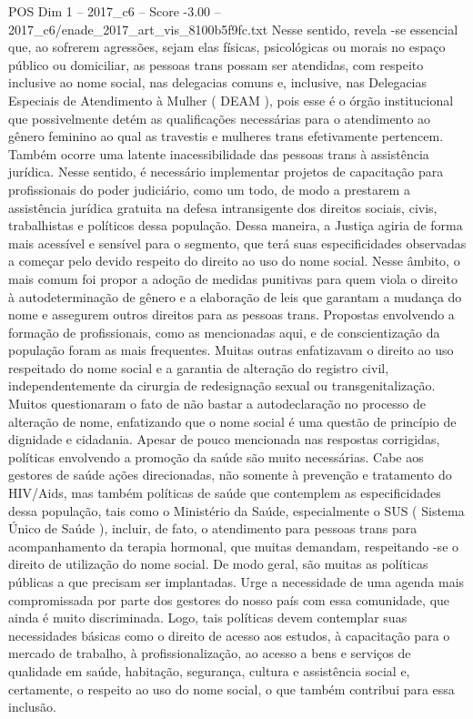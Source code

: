 \begin{textsample}{POS Dim 1 – 2017\_c6 – Score -3.00 – 2017\_c6/enade\_2017\_art\_vis\_8100b5f9fc.txt}
Nesse sentido, revela -se essencial que, ao sofrerem agressões, sejam elas físicas, psicológicas ou morais no espaço público ou domiciliar, as pessoas trans possam ser atendidas, com respeito inclusive ao nome social, nas delegacias comuns e, inclusive, nas Delegacias Especiais de Atendimento à Mulher ( DEAM ), pois esse é o órgão institucional que possivelmente detém as qualificações necessárias para o atendimento ao gênero feminino ao qual as travestis e mulheres trans efetivamente pertencem.
Também ocorre uma latente inacessibilidade das pessoas trans à assistência jurídica.
Nesse sentido, é necessário implementar projetos de capacitação para profissionais do poder judiciário, como um todo, de modo a prestarem a assistência jurídica gratuita na defesa intransigente dos direitos sociais, civis, trabalhistas e políticos dessa população.
Dessa maneira, a Justiça agiria de forma mais acessível e sensível para o segmento, que terá suas especificidades observadas a começar pelo devido respeito do direito ao uso do nome social.
Nesse âmbito, o mais comum foi propor a adoção de medidas punitivas para quem viola o direito à autodeterminação de gênero e a elaboração de leis que garantam a mudança do nome e assegurem outros direitos para as pessoas trans.
Propostas envolvendo a formação de profissionais, como as mencionadas aqui, e de conscientização da população foram as mais frequentes.
Muitas outras enfatizavam o direito ao uso respeitado do nome social e a garantia de alteração do registro civil, independentemente da cirurgia de redesignação sexual ou transgenitalização.
Muitos questionaram o fato de não bastar a autodeclaração no processo de alteração de nome, enfatizando que o nome social é uma questão de princípio de dignidade e cidadania.
Apesar de pouco mencionada nas respostas corrigidas, políticas envolvendo a promoção da saúde são muito necessárias.
Cabe aos gestores de saúde ações direcionadas, não somente à prevenção e tratamento do HIV/Aids, mas também políticas de saúde que contemplem as especificidades dessa população, tais como o Ministério da Saúde, especialmente o SUS ( Sistema Único de Saúde ), incluir, de fato, o atendimento para pessoas trans para acompanhamento da terapia hormonal, que muitas demandam, respeitando -se o direito de utilização do nome social.
De modo geral, são muitas as políticas públicas a que precisam ser implantadas.
Urge a necessidade de uma agenda mais compromissada por parte dos gestores do nosso país com essa comunidade, que ainda é muito discriminada.
Logo, tais políticas devem contemplar suas necessidades básicas como o direito de acesso aos estudos, à capacitação para o mercado de trabalho, à profissionalização, ao acesso a bens e serviços de qualidade em saúde, habitação, segurança, cultura e assistência social e, certamente, o respeito ao uso do nome social, o que também contribui para essa inclusão.

\end{textsample}

